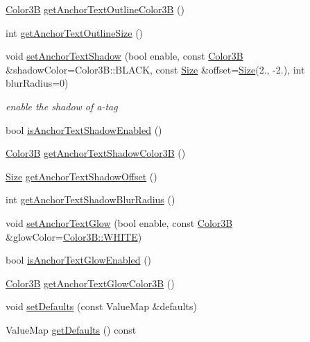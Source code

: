 \begin{DoxyCompactItemize}
\hyperlink{structColor3B}{Color3B} \hyperlink{classui_1_1RichText_aa8c308cac49231bb2c1a9f36526333f9}{get\+Anchor\+Text\+Outline\+Color3B} ()
\item 
int \hyperlink{classui_1_1RichText_a9f64b2a515def4e43cfc4f28d874ecff}{get\+Anchor\+Text\+Outline\+Size} ()
\item 
\mbox{\label{classui_1_1RichText_ae3e0bd83332893cd92078da8f4b0caab}} 
void \hyperlink{classui_1_1RichText_ae3e0bd83332893cd92078da8f4b0caab}{set\+Anchor\+Text\+Shadow} (bool enable, const \hyperlink{structColor3B}{Color3B} \&shadow\+Color=Color3\+B\+::\+B\+L\+A\+CK, const \hyperlink{classSize}{Size} \&offset=\hyperlink{classSize}{Size}(2., -\/2.), int blur\+Radius=0)
\begin{DoxyCompactList}\small\item\em enable the shadow of a-\/tag \end{DoxyCompactList}\item 
bool \hyperlink{classui_1_1RichText_a565ca0b2333f5a6aeb2ea07863ba8892}{is\+Anchor\+Text\+Shadow\+Enabled} ()
\item 
\hyperlink{structColor3B}{Color3B} \hyperlink{classui_1_1RichText_a4f1fbacca39aa0b5104e3df63fe558c2}{get\+Anchor\+Text\+Shadow\+Color3B} ()
\item 
\hyperlink{classSize}{Size} \hyperlink{classui_1_1RichText_a1e937cf6d302328c7ff37fa20ab5a049}{get\+Anchor\+Text\+Shadow\+Offset} ()
\item 
int \hyperlink{classui_1_1RichText_a427e82aabe87ba960aacdad621f82bb4}{get\+Anchor\+Text\+Shadow\+Blur\+Radius} ()
\item 
void \hyperlink{classui_1_1RichText_a71a3a6d9c9bb3c62b36b5b989b7a3c55}{set\+Anchor\+Text\+Glow} (bool enable, const \hyperlink{structColor3B}{Color3B} \&glow\+Color=\hyperlink{structColor3B_adf57cb86ca15f434b29215ad471cdc35}{Color3\+B\+::\+W\+H\+I\+TE})
\item 
bool \hyperlink{classui_1_1RichText_a74d51f173cc76e9141e536eaaa31e817}{is\+Anchor\+Text\+Glow\+Enabled} ()
\item 
\hyperlink{structColor3B}{Color3B} \hyperlink{classui_1_1RichText_a6b4271d09fe2e6e1f7b501dfd3da36b2}{get\+Anchor\+Text\+Glow\+Color3B} ()
\item 
void \hyperlink{classui_1_1RichText_afa1a22d29820f1174ad61b2a65f24211}{set\+Defaults} (const Value\+Map \&defaults)
\item 
Value\+Map \hyperlink{classui_1_1RichText_a63f5715a0904d8799910a300854cc2f6}{get\+Defaults} () const

\end{DoxyCompactItemize}
